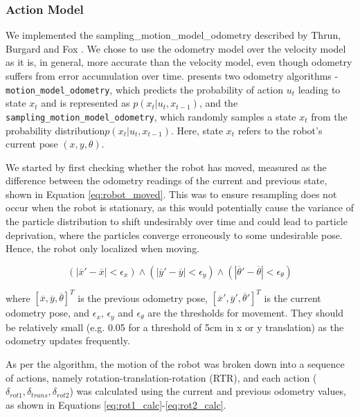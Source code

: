 \documentclass[journal]{IEEEtran}
\begin{document}
        \subsubsection{Action Model}
            \label{ssec:action_model}
            
            We implemented the sampling\_motion\_model\_odometry described by Thrun, Burgard and Fox \cite{Prob_Rob}. We chose to use the odometry model over the velocity model as it is, in general, more accurate than the velocity model, even though odometry suffers from error accumulation over time. \cite{Prob_Rob} presents two odometry algorithms - \texttt{motion\_model\_odometry}, which predicts the probability of action $u_{t}$ leading to state $x_{t}$ and is represented as $p(x_{t}|u_{t},x_{t-1})$, and the \texttt{sampling\_motion\_model\_odometry}, which randomly samples a state $x_{t}$ from the probability distribution$p(x_{t}|u_{t},x_{t-1})$. Here, state $x_{t}$ refers to the robot's current pose $(x,y,\theta)$. 
            
            We started by first checking whether the robot has moved, measured as the difference between the odometry readings of the current and previous state, shown in Equation \ref{eq:robot_moved}. This was to ensure resampling does not occur when the robot is stationary, as this would potentially cause the variance of the particle distribution to shift undesirably over time and could lead to particle deprivation, where the particles converge erroneously to some undesirable pose. Hence, the robot only localized when moving. 
            
            \begin{equation}
            \label{eq:robot_moved}
                ( |\overline{x}'-\overline{x}| < \epsilon_{x})  \wedge (|\overline{y}'-\overline{y}| < \epsilon_{y})   \wedge  (|\overline{\theta}'-\overline{\theta}| < \epsilon_{\theta})
            \end{equation}
            
            where $[\overline{x}, \overline{y}, \overline{\theta}]^{T}$ is the previous odometry pose, $[\overline{x}', \overline{y}', \overline{\theta}']^{T}$ is the current odometry pose, and $\epsilon_{x}$, $\epsilon_{y}$ and $\epsilon_{\theta}$ are the thresholds for movement. They should be relatively small (e.g. 0.05 for a threshold of 5cm in x or y translation) as the odometry updates frequently.

            As per the algorithm, the motion of the robot was broken down into a sequence of actions, namely rotation-translation-rotation (RTR), and each action ($\delta_{rot1}, \delta_{trans}, \delta_{rot2}$) was calculated using the current and previous odometry values, as shown in Equations \ref{eq:rot1_calc}-\ref{eq:rot2_calc}. 
            
\end{document}
